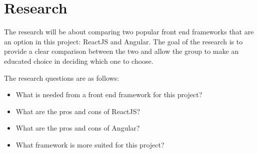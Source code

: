 \section{Research}
The research will be about comparing two popular front end frameworks that are an option in this project: ReactJS and Angular. The goal of the research is to provide a clear comparison between the two and allow the group to make an educated choice in deciding which one to choose.

The research questions are as follows:
\begin{itemize}\itemsep 1pt
	\item What is needed from a front end framework for this project?
	\item What are the pros and cons of ReactJS?
	\item What are the pros and cons of Angular?
	\item What framework is more suited for this project?
\end{itemize}